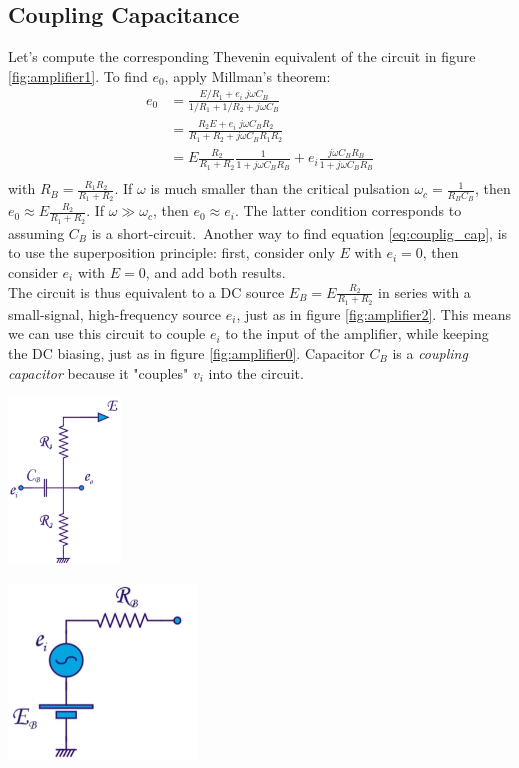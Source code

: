 \subsection{Coupling Capacitance}
Let's compute the corresponding Thevenin equivalent of the circuit in figure \ref{fig:amplifier1}. To find $e_0$, apply Millman's theorem:
\begin{equation}
	\begin{split}
		e_0 &= \frac{E/R_1 + e_i \; j\omega C_B}{1/R_1 + 1/R_2 + j\omega C_B} \\
		&= \frac{R_2 E + e_i \; j\omega C_B R_2}{R_1 + R_2 + j\omega C_B R_1 R_2} \\
		&= E \frac{R_2}{R_1+R_2}\frac{1}{1+j\omega C_B R_B} + e_i\frac{j\omega C_B R_B}{1+j\omega C_B R_B}\\
	\end{split}
	\label{eq:couplig_cap}
\end{equation}
with $R_B = \frac{R_1 R_2}{R_1 + R_2}$. If $\omega$ is much smaller than the critical pulsation $\omega_c = \frac{1}{R_B C_B}$, then $e_0 \approx  E \frac{R_2}{R_1+R_2}$. If $\omega \gg \omega_c$, then $e_0 \approx e_i$. The latter condition corresponds to assuming $C_B$ is a short-circuit.\ Another way to find equation \ref{eq:couplig_cap}, is to use the superposition principle: first, consider only $E$ with $e_i = 0$, then consider $e_i$ with $E=0$, and add both results.\\
The circuit is thus equivalent to a DC source $E_B = E \frac{R_2}{R_1+R_2}$ in series with a small-signal, high-frequency source $e_i$, just as in  figure \ref{fig:amplifier2}. This means we can use this circuit to couple $e_i$ to the input of the amplifier, while keeping the DC biasing, just as in figure \ref{fig:amplifier0}. Capacitor $C_B$ is a \emph{coupling capacitor} because it "couples" $v_i$ into the circuit.\\
\begin{minipage}{.5\textwidth}
	\centering
	\includegraphics[width=3cm]{figures/ch02/amplifier1.jpg}
	\label{fig:amplifier1}
\end{minipage}%
\begin{minipage}{.5\textwidth}
	\centering
	\includegraphics[width=5cm]{figures/ch02/amplifier2.jpg}
	\label{fig:amplifier2}
\end{minipage}

